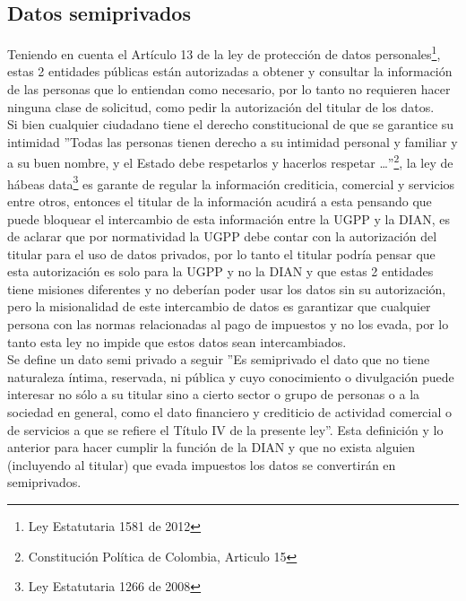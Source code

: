 \documentclass[
letterpaper,
12pt,
singlespacing,
headsepline]{article}
\begin{document}
\subsection{Datos semiprivados}
\label{subsec:semiprivados}
Teniendo en cuenta el Artículo 13 de la ley de protección de datos personales\footnote{Ley Estatutaria 1581 de 2012}, estas 2 entidades públicas están autorizadas a obtener y consultar la información de las personas que lo entiendan como necesario, por lo tanto no requieren hacer ninguna clase de solicitud, como pedir la autorización del titular de los datos.
\\
Si bien cualquier ciudadano tiene el derecho constitucional de que se garantice su intimidad ''Todas las personas tienen derecho a su intimidad personal y familiar y a su  buen nombre, y el Estado debe respetarlos y hacerlos respetar \dots''\footnote{Constitución Política de Colombia, Articulo 15}, la ley de hábeas data\footnote{Ley Estatutaria 1266 de 2008} es garante de regular la información crediticia, comercial y servicios entre otros, entonces el titular de la información acudirá a esta pensando que puede bloquear el intercambio de esta información entre la UGPP y la DIAN, es de aclarar que por normatividad la UGPP debe contar con la autorización del titular para el uso de datos privados, por lo tanto el titular podría pensar que esta autorización es solo para la UGPP y no la DIAN y que estas 2 entidades tiene misiones diferentes y no deberían poder usar los datos sin su autorización, pero la misionalidad de este intercambio de datos es garantizar que cualquier persona con las normas relacionadas al pago de impuestos y no los evada, por lo tanto esta ley no impide que estos datos sean intercambiados.
\\
Se define un dato  semi privado a seguir ''Es semiprivado el dato que no tiene naturaleza íntima, reservada, ni pública y cuyo conocimiento o divulgación puede interesar no sólo a su titular sino a cierto sector o grupo de personas o a la sociedad en general, como el dato financiero y crediticio de actividad comercial o de servicios a que se refiere el Título IV de la presente ley''. Esta definición y lo anterior para hacer cumplir la función de la DIAN y que no exista alguien (incluyendo al titular) que evada impuestos los datos se convertirán en semiprivados.




\printbibliography[heading=bibintoc]
\end{document}
